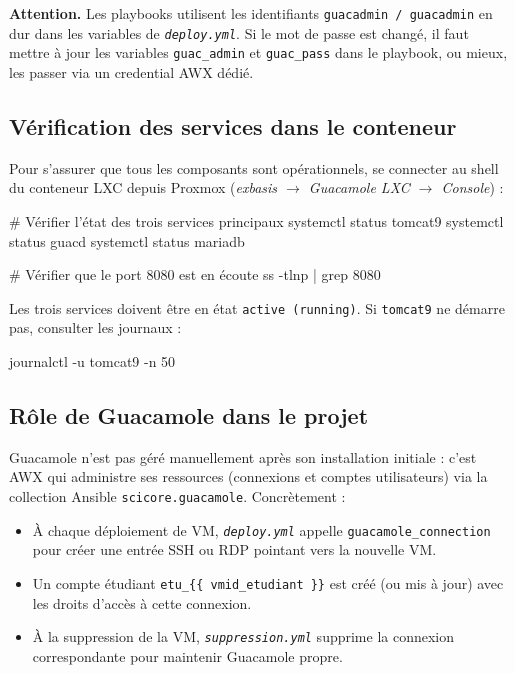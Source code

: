 \documentclass[a4paper]{article}
\newcommand{\cmd}[1]{\texttt{#1}}
\newcommand{\file}[1]{\texttt{\textit{#1}}}
\begin{document}
\begin{warnbox}
  \textbf{Attention.} Les playbooks utilisent les identifiants \cmd{guacadmin / guacadmin} en dur dans les variables de \file{deploy.yml}. Si le mot de passe est changé, il faut mettre à jour les variables \cmd{guac\_admin} et \cmd{guac\_pass} dans le playbook, ou mieux, les passer via un credential AWX dédié.
\end{warnbox}

\subsection{Vérification des services dans le conteneur}

Pour s'assurer que tous les composants sont opérationnels, se connecter au shell du conteneur LXC depuis Proxmox (\textit{exbasis \(\to\) Guacamole LXC \(\to\) Console}) :

\begin{bashcode}
# Vérifier l'état des trois services principaux
systemctl status tomcat9
systemctl status guacd
systemctl status mariadb

# Vérifier que le port 8080 est en écoute
ss -tlnp | grep 8080
\end{bashcode}

Les trois services doivent être en état \cmd{active (running)}. Si \cmd{tomcat9} ne démarre pas, consulter les journaux :

\begin{bashcode}
journalctl -u tomcat9 -n 50
\end{bashcode}

\subsection{Rôle de Guacamole dans le projet}

Guacamole n'est pas géré manuellement après son installation initiale : c'est AWX qui administre ses ressources (connexions et comptes utilisateurs) via la collection Ansible \cmd{scicore.guacamole}. Concrètement :

\begin{itemize}
  \item À chaque déploiement de VM, \file{deploy.yml} appelle \cmd{guacamole\_connection} pour créer une entrée SSH ou RDP pointant vers la nouvelle VM.
  \item Un compte étudiant \cmd{etu\_\{\{ vmid\_etudiant \}\}} est créé (ou mis à jour) avec les droits d'accès à cette connexion.
  \item À la suppression de la VM, \file{suppression.yml} supprime la connexion correspondante pour maintenir Guacamole propre.
\end{itemize}
\end{document}

